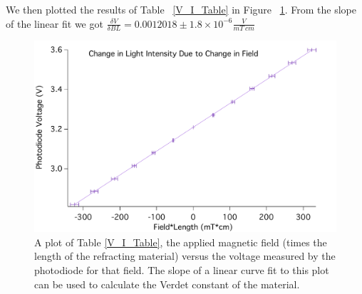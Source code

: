 \documentclass[prb,preprint]{revtex4-1}
\begin{document}

We then plotted the results of Table ~\ref{V_I_Table} in Figure ~\ref{V_B*L_Plot}. From the slope of the linear fit we got $\frac{\delta V}{\delta BL} = 0.0012018 \pm 1.8 \times 10^{-6} \frac{V}{mT\ cm}$

\begin{figure}[h!]
\centering
\includegraphics[width=5in]{V_B-L_Plot.pdf}
\caption{A plot of Table \ref{V_I_Table}, the applied magnetic field (times the length of the refracting material) versus the voltage measured by the photodiode for that field. The slope of a linear curve fit to this plot can be used to calculate the Verdet constant of the material. }
\label{V_B*L_Plot}
\end{figure}
\end{document}
